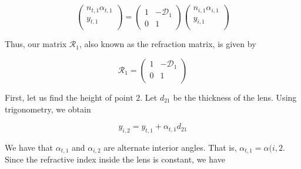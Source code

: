 \documentclass[11pt]{article}
\begin{document}
\begin{pproblem}
\begin{pssolution*}{}{}
\begin{alternativas}
            \[\left(\begin{matrix}
                n_{t,1}\alpha_{t,1} \\
                y_{t,1}\\
            \end{matrix}\right) = \left(\begin{matrix}
                1 & - \mathcal{D}_1 \\
                0 & 1
            \end{matrix}\right)\left(\begin{matrix}
                n_{i,1}\alpha_{i,1} \\
                y_{i,1}\\
            \end{matrix}\right)\]

            Thus, our matrix \(\mathcal{R}_1\), also known as the refraction matrix, is given by

            \[\boxed{\mathcal{R}_1 = \left(\begin{matrix}
            1 & -\mathcal{D}_1 \\
            0 & 1 \\
            \end{matrix}\right)}\]

        \item First, let us find the height of point \(2\). Let \(d_{21}\) be the thickness of the lens. Using trigonometry, we obtain
        
        \[y_{i,2} = y_{t,1} + \alpha_{t,1}d_{21}\]

        We have that \(\alpha_{t,1}\) and \(\alpha_{i,2}\) are alternate interior angles. That is, \(\alpha_{t,1}=\alpha({i,2}\). Since the refractive index inside the lens is constant, we have
        \[\] 
        \end{alternativas}
\end{pssolution*}

\end{pproblem}
\end{document}
